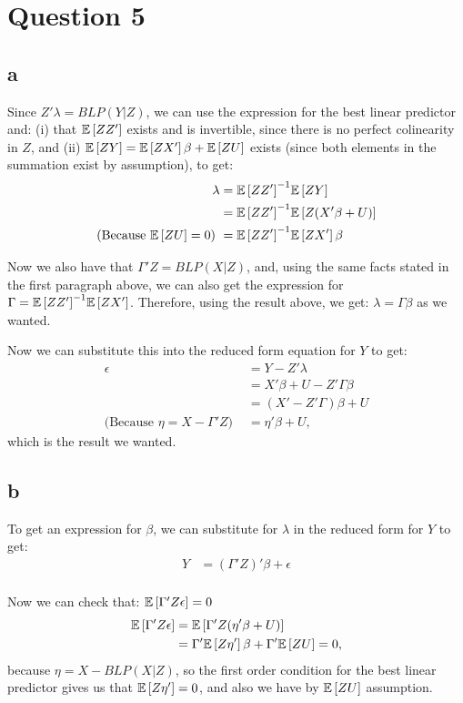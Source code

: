 \documentclass[12pt]{paper}
\begin{document}
\section*{Question 5}

\subsection*{a}

Since $Z'\lambda=BLP(Y|Z)$, we can use the expression for the best linear predictor and: (i) that $\mathbb{E} \left [ ZZ' \right ]$ exists and is invertible, since there is no perfect colinearity in $Z$, and (ii) $\mathbb{E} \left [ ZY \right ]=\mathbb{E} \left [ ZX' \right ]\beta+\mathbb{E} \left [ ZU \right ]$ exists (since both elements in the summation exist by assumption), to get:
\begin{align*}
 \lambda&={\mathbb{E} \left [ ZZ' \right ]}^{-1}\mathbb{E} \left [ ZY \right ]\\
 &={\mathbb{E} \left [ ZZ' \right ]}^{-1}\mathbb{E} \left [ Z(X'\beta+U) \right ]\\
\text{(Because $\mathbb{E} \left [ ZU \right ]=0$)   }  &={\mathbb{E} \left [ ZZ' \right ]}^{-1}\mathbb{E} \left [ ZX' \right ]\beta 
\end{align*}

Now we also have that $\Gamma'Z=BLP(X|Z)$, and, using the same facts stated in the first paragraph above, we can also get the expression for $\Gamma={\mathbb{E} \left [ ZZ' \right ]}^{-1}\mathbb{E} \left [ ZX' \right ]$. Therefore, using the result above, we get: $\lambda=\Gamma\beta$ as we wanted.

Now we can substitute this into the reduced form equation for $Y$ to get:
\begin{align*}
\epsilon&=Y-Z'\lambda\\
&=X'\beta+U-Z'\Gamma\beta\\
&=(X'-Z'\Gamma)\beta+U\\
\text{(Because $\eta=X-\Gamma'Z$)   }&=\eta'\beta+U,
\end{align*}
\noindent which is the result we wanted.

\subsection*{b}

To get an expression for $\beta$, we can substitute for $\lambda$ in the reduced form for $Y$ to get:
\begin{align*}
Y&=(\Gamma'Z)'\beta+\epsilon\\
\end{align*}

Now we can check that: $\mathbb{E} \left [ \Gamma'Z\epsilon \right ]=0$
\begin{align*}
\mathbb{E} \left [ \Gamma'Z\epsilon \right ]&=\mathbb{E} \left [ \Gamma'Z(\eta'\beta+U) \right ]\\
&=\Gamma'\mathbb{E} \left [ Z\eta' \right ]\beta+\Gamma'\mathbb{E} \left [ ZU \right ]=0,
\end{align*}
\noindent because $\eta=X-BLP(X|Z)$, so the first order condition for the best linear predictor gives us that $\mathbb{E} \left [ Z\eta' \right ]=0$, and also we have by $\mathbb{E} \left [ ZU \right ]$ assumption.
\end{document}
